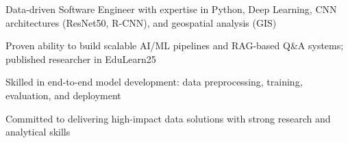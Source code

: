 
\begin{cventries}

  \cventry
    {} %
    {} %
    {} %
    {} %
    {
      \begin{cvitems}
        \item {Data-driven Software Engineer with expertise in Python, Deep Learning, CNN architectures (ResNet50, R-CNN), and geospatial analysis (GIS)}
        \item {Proven ability to build scalable AI/ML pipelines and RAG-based Q\&A systems; published researcher in EduLearn25}
        \item {Skilled in end-to-end model development: data preprocessing, training, evaluation, and deployment}
        \item {Committed to delivering high-impact data solutions with strong research and analytical skills}
      \end{cvitems}
    }

\end{cventries}
